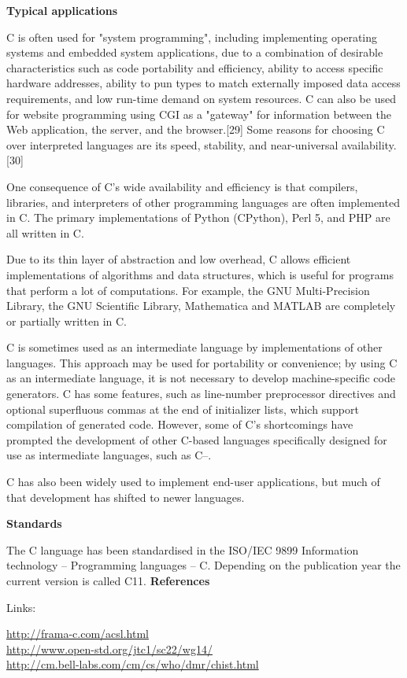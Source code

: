 \documentclass{./template/openetcs_report}
\begin{document}
	\textbf{Typical applications}

C is often used for "system programming", including implementing operating systems and embedded system applications, due to a combination of desirable characteristics such as code portability and efficiency, ability to access specific hardware addresses, ability to pun types to match externally imposed data access requirements, and low run-time demand on system resources. C can also be used for website programming using CGI as a "gateway" for information between the Web application, the server, and the browser.[29] Some reasons for choosing C over interpreted languages are its speed, stability, and near-universal availability.[30]

One consequence of C's wide availability and efficiency is that compilers, libraries, and interpreters of other programming languages are often implemented in C. The primary implementations of Python (CPython), Perl 5, and PHP are all written in C.

Due to its thin layer of abstraction and low overhead, C allows efficient implementations of algorithms and data structures, which is useful for programs that perform a lot of computations. For example, the GNU Multi-Precision Library, the GNU Scientific Library, Mathematica and MATLAB are completely or partially written in C.

C is sometimes used as an intermediate language by implementations of other languages. This approach may be used for portability or convenience; by using C as an intermediate language, it is not necessary to develop machine-specific code generators. C has some features, such as line-number preprocessor directives and optional superfluous commas at the end of initializer lists, which support compilation of generated code. However, some of C's shortcomings have prompted the development of other C-based languages specifically designed for use as intermediate languages, such as C--.

C has also been widely used to implement end-user applications, but much of that development has shifted to newer languages.



	\textbf{Standards}

The C language has been standardised in the ISO/IEC 9899 Information technology -- Programming languages -- C.
Depending on the publication year the current version is called C11.
	\textbf{References}

Links:

\url{http://frama-c.com/acsl.html} \\[4pt]
\url{http://www.open-std.org/jtc1/sc22/wg14/} \\[4pt]
\url{http://cm.bell-labs.com/cm/cs/who/dmr/chist.html} \\[4pt]
\end{document}
